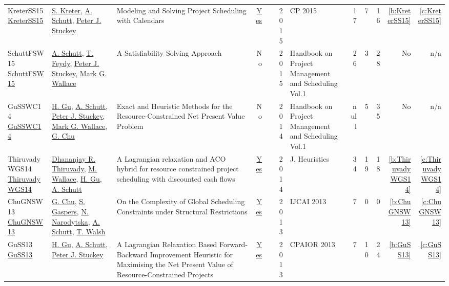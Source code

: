 {\begin{longtable}{>{\raggedright\arraybackslash}p{3cm}>{\raggedright\arraybackslash}p{6cm}>{\raggedright\arraybackslash}p{6.5cm}rrrp{2.5cm}rrrrr}
KreterSS15 \href{https://doi.org/10.1007/978-3-319-23219-5\_19}{KreterSS15} & \hyperref[auth:a124]{S. Kreter}, \hyperref[auth:a125]{A. Schutt}, \hyperref[auth:a126]{Peter J. Stuckey} & Modeling and Solving Project Scheduling with Calendars & \href{../works/KreterSS15.pdf}{Yes} & \cite{KreterSS15} & 2015 & CP 2015 & 17 & 7 & 16 & \ref{b:KreterSS15} & \ref{c:KreterSS15}\\
SchuttFSW15 \href{https://doi.org/10.1007/978-3-319-05443-8_7}{SchuttFSW15} & \hyperref[auth:a125]{A. Schutt}, \hyperref[auth:a155]{T. Feydy}, \hyperref[auth:a126]{Peter J. Stuckey}, \hyperref[auth:a156]{Mark G. Wallace} & A Satisfiability Solving Approach & No & \cite{SchuttFSW15} & 2015 & Handbook on Project Management and Scheduling Vol.1 & 26 & 3 & 28 & No & n/a\\
GuSSWC14 \href{http://dx.doi.org/10.1007/978-3-319-05443-8_14}{GuSSWC14} & \hyperref[auth:a342]{H. Gu}, \hyperref[auth:a125]{A. Schutt}, \hyperref[auth:a126]{Peter J. Stuckey}, \hyperref[auth:a156]{Mark G. Wallace}, \hyperref[auth:a349]{G. Chu} & Exact and Heuristic Methods for the Resource-Constrained Net Present Value Problem & No & \cite{GuSSWC14} & 2014 & Handbook on Project Management and Scheduling Vol.1 & null & 5 & 35 & No & n/a\\
ThiruvadyWGS14 \href{https://doi.org/10.1007/s10732-014-9260-3}{ThiruvadyWGS14} & \hyperref[auth:a402]{Dhananjay R. Thiruvady}, \hyperref[auth:a117]{M. Wallace}, \hyperref[auth:a342]{H. Gu}, \hyperref[auth:a125]{A. Schutt} & A Lagrangian relaxation and {ACO} hybrid for resource constrained project scheduling with discounted cash flows & \href{../works/ThiruvadyWGS14.pdf}{Yes} & \cite{ThiruvadyWGS14} & 2014 & J. Heuristics & 34 & 19 & 18 & \ref{b:ThiruvadyWGS14} & \ref{c:ThiruvadyWGS14}\\
ChuGNSW13 \href{http://www.aaai.org/ocs/index.php/IJCAI/IJCAI13/paper/view/6878}{ChuGNSW13} & \hyperref[auth:a349]{G. Chu}, \hyperref[auth:a805]{S. Gaspers}, \hyperref[auth:a806]{N. Narodytska}, \hyperref[auth:a125]{A. Schutt}, \hyperref[auth:a279]{T. Walsh} & On the Complexity of Global Scheduling Constraints under Structural Restrictions & \href{../works/ChuGNSW13.pdf}{Yes} & \cite{ChuGNSW13} & 2013 & IJCAI 2013 & 7 & 0 & 0 & \ref{b:ChuGNSW13} & \ref{c:ChuGNSW13}\\
GuSS13 \href{https://doi.org/10.1007/978-3-642-38171-3\_24}{GuSS13} & \hyperref[auth:a342]{H. Gu}, \hyperref[auth:a125]{A. Schutt}, \hyperref[auth:a126]{Peter J. Stuckey} & A Lagrangian Relaxation Based Forward-Backward Improvement Heuristic for Maximising the Net Present Value of Resource-Constrained Projects & \href{../works/GuSS13.pdf}{Yes} & \cite{GuSS13} & 2013 & CPAIOR 2013 & 7 & 10 & 24 & \ref{b:GuSS13} & \ref{c:GuSS13}\\

\end{longtable}}
